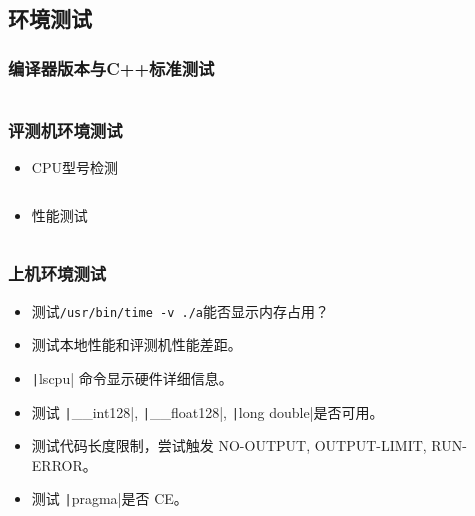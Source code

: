 \documentclass[a4paper, twoside]{article}
\begin{document}

\subsection{环境测试}
    \subsubsection{编译器版本与C++标准测试}
    \inputminted{cpp}{../src/附录/环境测试/编译器版本与C++标准测试.cpp}

    \subsubsection{评测机环境测试}
    \begin{itemize}
        \item CPU型号检测
        \inputminted{cpp}{../src/附录/环境测试/CPU型号检测.cpp}
        \item 性能测试
        \inputminted{cpp}{../src/附录/环境测试/性能测试.cpp}
    \end{itemize}

    \subsubsection{上机环境测试}
    \begin{itemize}
        \item 测试\texttt{/usr/bin/time -v ./a}能否显示内存占用？
        \item 测试本地性能和评测机性能差距。
        \item \texttt|lscpu| 命令显示硬件详细信息。
        \item 测试 \texttt|__int128|, \texttt|__float128|, \texttt|long double|是否可用。
        \item 测试代码长度限制，尝试触发 NO-OUTPUT, OUTPUT-LIMIT, RUN-ERROR。
        \item 测试 \texttt|pragma|是否 CE。
    \end{itemize}
\end{document}
